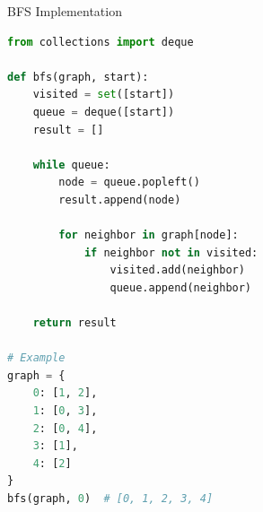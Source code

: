 \documentclass[aspectratio=169]{beamer}
\begin{document}
\begin{frame}[fragile]{BFS Implementation}
  \begin{lstlisting}[language=Python, basicstyle=\ttfamily\small]
from collections import deque

def bfs(graph, start):
    visited = set([start])
    queue = deque([start])
    result = []

    while queue:
        node = queue.popleft()
        result.append(node)

        for neighbor in graph[node]:
            if neighbor not in visited:
                visited.add(neighbor)
                queue.append(neighbor)

    return result

# Example
graph = {
    0: [1, 2],
    1: [0, 3],
    2: [0, 4],
    3: [1],
    4: [2]
}
bfs(graph, 0)  # [0, 1, 2, 3, 4]
  \end{lstlisting}
\end{frame}
\end{document}
